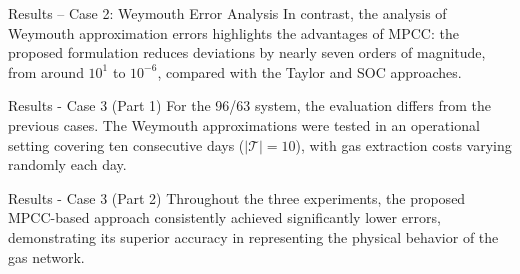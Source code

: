 \documentclass[hyperref={colorlinks,citecolor=blue,linkcolor=blue,urlcolor=blue}]{beamer}
\newlength\figureheight
\newlength\figurewidth
\begin{document}
\begin{frame}{Results – Case 2: Weymouth Error Analysis}
\footnotesize
\justifying
In contrast, the analysis of Weymouth approximation errors highlights the 
advantages of MPCC: the proposed formulation reduces deviations by nearly 
seven orders of magnitude, from around $10^1$ to $10^{-6}$, compared with 
the Taylor and SOC approaches.

\vspace{0.5em}
\begin{figure}[!htb]
    \centering
    \setlength{}        
    \setlength{}
    \subfloat[Taylor]{}
    \subfloat[SOC]{}
    \subfloat[MPCC]{}
    \label{fig:green_test_error}
\end{figure}
\end{frame}


\begin{frame}{Results - Case 3 (Part 1)}
\footnotesize
    \justifying
    For the 96/63 system, the evaluation differs from the previous cases. 
    The Weymouth approximations 
    were tested in an operational setting covering ten consecutive days 
    ($|\mathcal{T}|=10$), with gas extraction costs varying randomly each day.
     \vspace{0.9em}   
    \begin{figure}[!htb]
        \centering
        \setlength{}        
        \setlength{}
        
        \label{fig:red_test_cost}
    \end{figure}
\end{frame}


\begin{frame}{Results - Case 3 (Part 2)}
\footnotesize
    \justifying
    Throughout the three experiments, the proposed MPCC-based approach consistently achieved significantly lower errors, demonstrating its superior accuracy in representing the physical behavior of the gas network.    \vspace{0.9em}
    \begin{figure}[!htb]
        \setlength{}        
        \setlength{} 
    \end{figure}
\end{frame}
\end{document}
